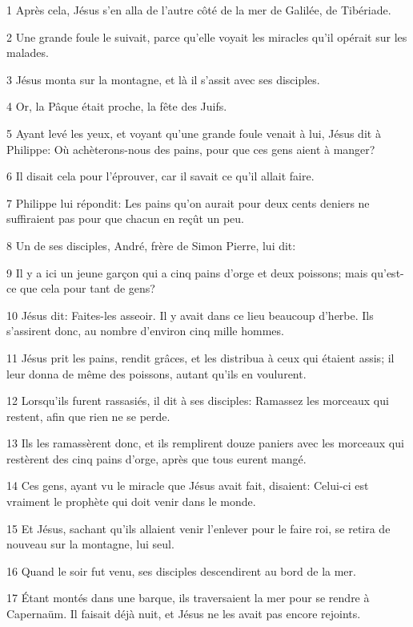 \par 1 Après cela, Jésus s'en alla de l'autre côté de la mer de Galilée, de Tibériade.
\par 2 Une grande foule le suivait, parce qu'elle voyait les miracles qu'il opérait sur les malades.
\par 3 Jésus monta sur la montagne, et là il s'assit avec ses disciples.
\par 4 Or, la Pâque était proche, la fête des Juifs.
\par 5 Ayant levé les yeux, et voyant qu'une grande foule venait à lui, Jésus dit à Philippe: Où achèterons-nous des pains, pour que ces gens aient à manger?
\par 6 Il disait cela pour l'éprouver, car il savait ce qu'il allait faire.
\par 7 Philippe lui répondit: Les pains qu'on aurait pour deux cents deniers ne suffiraient pas pour que chacun en reçût un peu.
\par 8 Un de ses disciples, André, frère de Simon Pierre, lui dit:
\par 9 Il y a ici un jeune garçon qui a cinq pains d'orge et deux poissons; mais qu'est-ce que cela pour tant de gens?
\par 10 Jésus dit: Faites-les asseoir. Il y avait dans ce lieu beaucoup d'herbe. Ils s'assirent donc, au nombre d'environ cinq mille hommes.
\par 11 Jésus prit les pains, rendit grâces, et les distribua à ceux qui étaient assis; il leur donna de même des poissons, autant qu'ils en voulurent.
\par 12 Lorsqu'ils furent rassasiés, il dit à ses disciples: Ramassez les morceaux qui restent, afin que rien ne se perde.
\par 13 Ils les ramassèrent donc, et ils remplirent douze paniers avec les morceaux qui restèrent des cinq pains d'orge, après que tous eurent mangé.
\par 14 Ces gens, ayant vu le miracle que Jésus avait fait, disaient: Celui-ci est vraiment le prophète qui doit venir dans le monde.
\par 15 Et Jésus, sachant qu'ils allaient venir l'enlever pour le faire roi, se retira de nouveau sur la montagne, lui seul.
\par 16 Quand le soir fut venu, ses disciples descendirent au bord de la mer.
\par 17 Étant montés dans une barque, ils traversaient la mer pour se rendre à Capernaüm. Il faisait déjà nuit, et Jésus ne les avait pas encore rejoints.
